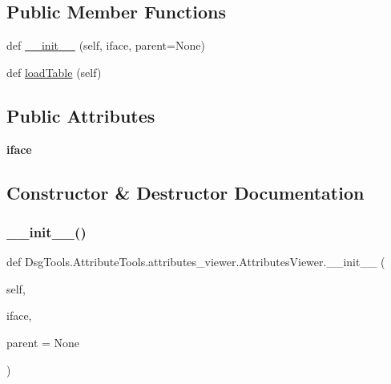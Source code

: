 \subsection*{Public Member Functions}
\begin{DoxyCompactItemize}
\item 
def \mbox{\hyperlink{class_dsg_tools_1_1_attribute_tools_1_1attributes__viewer_1_1_attributes_viewer_a2a5d9367e9c1f57653f77e80fe4d8878}{\+\_\+\+\_\+init\+\_\+\+\_\+}} (self, iface, parent=None)
\item 
def \mbox{\hyperlink{class_dsg_tools_1_1_attribute_tools_1_1attributes__viewer_1_1_attributes_viewer_aeb49b4d97a0b53de38bbe02c3d82c976}{load\+Table}} (self)
\end{DoxyCompactItemize}
\subsection*{Public Attributes}
\begin{DoxyCompactItemize}
\item 
\mbox{\label{class_dsg_tools_1_1_attribute_tools_1_1attributes__viewer_1_1_attributes_viewer_a7893d179ae476180da5af9f93ab8ee85}} 
{\bfseries iface}
\end{DoxyCompactItemize}


\subsection{Constructor \& Destructor Documentation}
\mbox{\label{class_dsg_tools_1_1_attribute_tools_1_1attributes__viewer_1_1_attributes_viewer_a2a5d9367e9c1f57653f77e80fe4d8878}} 
\subsubsection{\texorpdfstring{\+\_\+\+\_\+init\+\_\+\+\_\+()}{\_\_init\_\_()}}
{\footnotesize\ttfamily def Dsg\+Tools.\+Attribute\+Tools.\+attributes\+\_\+viewer.\+Attributes\+Viewer.\+\_\+\+\_\+init\+\_\+\+\_\+ (\begin{DoxyParamCaption}\item[{}]{self,  }\item[{}]{iface,  }\item[{}]{parent = {\ttfamily None} }\end{DoxyParamCaption})}


